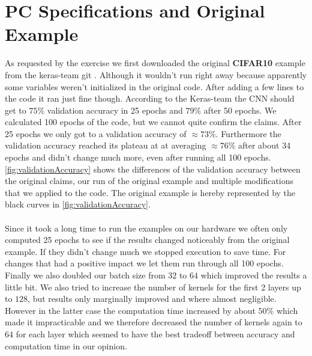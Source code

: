 \documentclass{article}
\begin{document}
	\section{PC Specifications and Original Example}
	\label{sec:PCSpecificationsAndOriginalExample}
	As requested by the exercise we first downloaded the original \textbf{CIFAR10} example from the keras-team git \cite{Keras2018CIFAR10}. Although it wouldn't run right away because apparently some variables weren't initialized in the original code. After adding a few lines to the code it ran just fine though. According to the Keras-team the CNN should get to $75\%$ validation accuracy in 25 epochs and $79\%$ after 50 epochs. We calculated 100 epochs of the code, but we cannot quite confirm the claims. After 25 epochs we only got to a validation accuracy of $\approx73\%$. Furthermore the validation accuracy reached its plateau at at averaging $\approx76\%$ after about 34 epochs and didn't change much more, even after running all 100 epochs. \autoref{fig:validationAccuracy} shows the differences of the validation accuracy between the original claims, our run of the original example and multiple modifications that we applied to the code. The original example is hereby represented by the black curves in \autoref{fig:validationAccuracy}. \\
	\\
	Since it took a long time to run the examples on our hardware we often only computed 25 epochs to see if the results changed noticeably from the original example. If they didn't change much we stopped execution to save time. For changes that had a positive impact we let them run through all 100 epochs. 
	Finally we also doubled our batch size from $32$ to $64$ which improved the results a little bit. We also tried to increase the number of kernels for the first 2 layers up to $128$, but results only marginally improved and where almost negligible. However in the latter case the computation time increased by about $50\%$ which made it impracticable and we therefore decreased the number of kernels again to $64$ for each layer which seemed to have the best tradeoff between accuracy and computation time in our opinion. 
	
\end{document}

